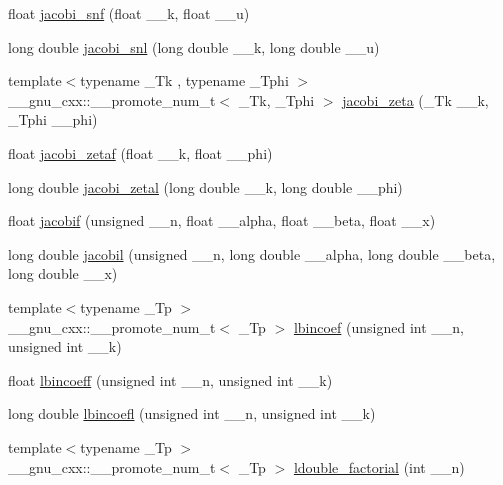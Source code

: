 \begin{DoxyCompactItemize}
\item 
float \hyperlink{namespace____gnu__cxx_a5981245b7343da6e21d445bb01fdba9c}{jacobi\+\_\+snf} (float \+\_\+\+\_\+k, float \+\_\+\+\_\+u)
\item 
long double \hyperlink{namespace____gnu__cxx_a1c13539e3b051a07b1c28aa8a0aeb1b4}{jacobi\+\_\+snl} (long double \+\_\+\+\_\+k, long double \+\_\+\+\_\+u)
\item 
{\footnotesize template$<$typename \+\_\+\+Tk , typename \+\_\+\+Tphi $>$ }\\\+\_\+\+\_\+gnu\+\_\+cxx\+::\+\_\+\+\_\+promote\+\_\+num\+\_\+t$<$ \+\_\+\+Tk, \+\_\+\+Tphi $>$ \hyperlink{namespace____gnu__cxx_ae22f0fc0fa1cac3bd0d3b3a4b2c33e7e}{jacobi\+\_\+zeta} (\+\_\+\+Tk \+\_\+\+\_\+k, \+\_\+\+Tphi \+\_\+\+\_\+phi)
\item 
float \hyperlink{namespace____gnu__cxx_aedb6b352331c67b9dea73660e2045668}{jacobi\+\_\+zetaf} (float \+\_\+\+\_\+k, float \+\_\+\+\_\+phi)
\item 
long double \hyperlink{namespace____gnu__cxx_a9db158df9459aa12c840724338753913}{jacobi\+\_\+zetal} (long double \+\_\+\+\_\+k, long double \+\_\+\+\_\+phi)
\item 
float \hyperlink{namespace____gnu__cxx_a450db12e06d6993d169afab5b3f6d0b8}{jacobif} (unsigned \+\_\+\+\_\+n, float \+\_\+\+\_\+alpha, float \+\_\+\+\_\+beta, float \+\_\+\+\_\+x)
\item 
long double \hyperlink{namespace____gnu__cxx_a2898a5ebf451eaf259ecfcdd171aa72b}{jacobil} (unsigned \+\_\+\+\_\+n, long double \+\_\+\+\_\+alpha, long double \+\_\+\+\_\+beta, long double \+\_\+\+\_\+x)
\item 
{\footnotesize template$<$typename \+\_\+\+Tp $>$ }\\\+\_\+\+\_\+gnu\+\_\+cxx\+::\+\_\+\+\_\+promote\+\_\+num\+\_\+t$<$ \+\_\+\+Tp $>$ \hyperlink{namespace____gnu__cxx_ab3eab510cd484f6ec75e968b1d98b818}{lbincoef} (unsigned int \+\_\+\+\_\+n, unsigned int \+\_\+\+\_\+k)
\item 
float \hyperlink{namespace____gnu__cxx_ab48439faacd87f02d088a04e7cee0853}{lbincoeff} (unsigned int \+\_\+\+\_\+n, unsigned int \+\_\+\+\_\+k)
\item 
long double \hyperlink{namespace____gnu__cxx_ab5b5d92a2a522aaef999106f5d602163}{lbincoefl} (unsigned int \+\_\+\+\_\+n, unsigned int \+\_\+\+\_\+k)
\item 
{\footnotesize template$<$typename \+\_\+\+Tp $>$ }\\\+\_\+\+\_\+gnu\+\_\+cxx\+::\+\_\+\+\_\+promote\+\_\+num\+\_\+t$<$ \+\_\+\+Tp $>$ \hyperlink{namespace____gnu__cxx_ac97a4a380940765948e0663fbc119544}{ldouble\+\_\+factorial} (int \+\_\+\+\_\+n)

\end{DoxyCompactItemize}
